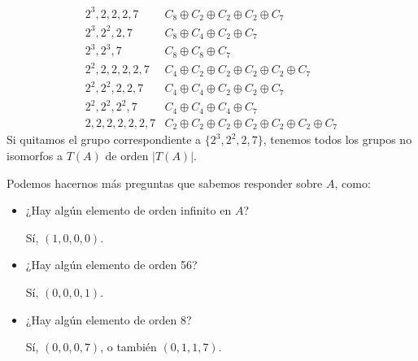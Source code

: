 \begin{ejemplo}
\begin{equation*}
\begin{array}{c|c}
        2^3, 2, 2, 2, 7 & C_8 \oplus C_2 \oplus C_2 \oplus C_2 \oplus C_7 \\
        2^3, 2^2, 2, 7 & C_8 \oplus C_4 \oplus C_2 \oplus C_7 \\
        2^3, 2^3, 7 & C_8 \oplus C_8 \oplus C_7 \\
        2^2, 2, 2, 2, 2, 7 & C_4 \oplus C_2 \oplus C_2 \oplus C_2 \oplus C_2 \oplus C_7 \\
        2^2, 2^2, 2, 2, 7 & C_4 \oplus C_4 \oplus C_2 \oplus C_2 \oplus C_7 \\
        2^2, 2^2, 2^2, 7 & C_4 \oplus C_4 \oplus C_4 \oplus C_7 \\
        2, 2, 2, 2, 2, 2, 7 & C_2 \oplus C_2 \oplus C_2 \oplus C_2 \oplus C_2 \oplus C_2 \oplus C_7
        \end{array}
    \end{equation*}
    Si quitamos el grupo correspondiente a $\{2^3, 2^2, 2, 7\}$, tenemos todos los grupos no isomorfos a $T(A)$ de orden $|T(A)|$.

    Podemos hacernos más preguntas que sabemos responder sobre $A$, como:
    \begin{itemize}
        \item ¿Hay algún elemento de orden infinito en $A$?

            Sí, $(1, 0, 0, 0)$.
        \item ¿Hay algún elemento de orden 56?

            Sí, $(0, 0, 0, 1)$.
        \item ¿Hay algún elemento de orden 8?

            Sí, $(0, 0, 0, 7)$, o también $(0, 1, 1, 7)$.
    \end{itemize}
\end{ejemplo}



